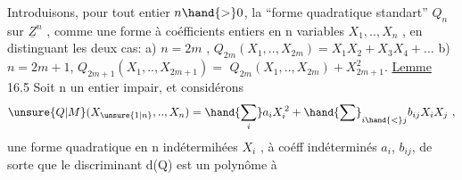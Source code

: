 Introduisons, pour tout entier  $n\hand{>}0$, la ``forme quadratique standart''
$Q_n$ sur $\underline{Z}^n$ , comme une forme à coéfficients entiers en n variables
$X_1,..,X_n$ ,  en distinguant les deux cas:
a)  $n = 2m$  ,  $Q_{2m}(X_1,..,X_{2m}) = X_1X_2 + X_3X_4 + \ldots$
b)  $n = 2m+1$,  $Q_{2m+1}(X_1,..,X_{2m+1}) =$ $Q_{2m}(X_1,..,X_{2m}) + X_{2m+1}^2$.
\uline{Lemme} 16.5  Soit n un entier impair, et considérons
\[ \unsure{Q|M}(X_{\unsure{1|n}},..,X_n) = \hand{\sum_i} a_iX_i^{\,2} + \hand{\sum}_{i\hand{<}j} b_{ij}X_iX_j \ , \]
une forme quadratique en n indétermihées $X_i$ , à coéff indéterminés
$a_i$, $b_{ij}$, de sorte que le discriminant  d(Q)  est un polynôme à


